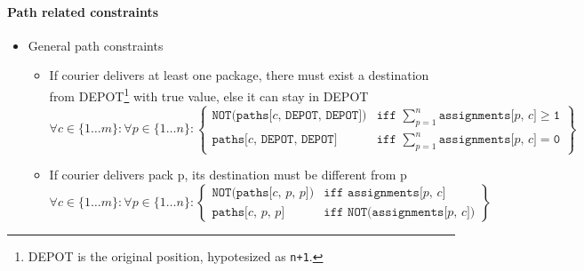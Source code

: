 \paragraph*{Path related constraints}

\begin{itemize}
    \item General path constraints
    \begin{itemize}
        \item If courier delivers at least one package, there must exist a destination from DEPOT\footnote{DEPOT is the original position, hypotesized as \texttt{n+1}.} with true value, else it can stay in DEPOT
        \begin{equation}
            \label{eq:gen_path_constr1}
            \forall c \in \{1 \ldots m\}:
            \forall p \in \{1 \ldots n\}:
            \left\{
                \begin{array}{lr}
                    \texttt{NOT(paths[$c$, DEPOT, DEPOT])} & \texttt{iff } \sum_{p=1}^{n} \texttt{assignments[$p$, $c$]} \geq \texttt{1}\\
                    \texttt{paths[$c$, DEPOT, DEPOT]} & \texttt{iff } \sum_{p=1}^{n} \texttt{assignments[$p$, $c$]} = \texttt{0} %
                \end{array}
            \right\}
        \end{equation}

        \item If courier delivers pack p, its destination must be different from p 
        \begin{equation}
            \label{eq:gen_path_constr2}
            \forall c \in \{1 \ldots m\}:
            \forall p \in \{1 \ldots n\}:
            \left\{
                \begin{array}{lr}
                    \texttt{NOT(paths[$c$, $p$, $p$])} & \texttt{iff } \texttt{assignments[$p$, $c$]}\\
                    \texttt{paths[$c$, $p$, $p$]} & \texttt{iff } \texttt{NOT(assignments[$p$, $c$])} %
                \end{array}
            \right\}
        \end{equation}


\end{itemize}
\end{itemize}
